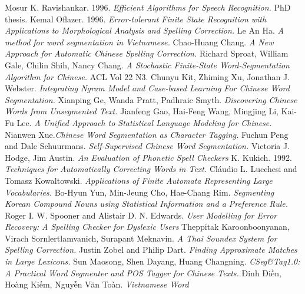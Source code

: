 \documentclass[a4paper,oneside]{book} %
\theoremstyle{break}
\begin{document}
\begin{thebibliography}{}
Mosur K. Ravishankar. 1996. {\em Efficient Algorithms for
  Speech Recognition.} PhD thesis. %
Kemal Oflazer. 1996. {\em Error-tolerant Finite State
  Recognition with Applications to Morphological Analysis and Spelling
  Correction.} %
Le An Ha. {\em A method for word segmentation in
  Vietnamese.} %
Chao-Huang Chang. {\em A New Approach for
  Automatic Chinese Spelling Correction.} %
Richard Sproat, William Gale, Chilin Shih, Nancy
  Chang. {\em A Stochastic Finite-State Word-Segmentation Algorithm for
  Chinese.} ACL Vol 22 N3.%
Chunyu Kit, Zhiming Xu, Jonathan
  J. Webster. {\em Integrating Ngram Model and Case-based Learning For
  Chinese Word Segmentation.}%
Xianping Ge, Wanda Pratt,
  Padhraic Smyth. {\em Discovering Chinese Words from Unsegmented
  Text.}%
Jianfeng Gao, Hai-Feng Wang, Mingjing Li, Kai-Fu
  Lee. {\em A Unified Approach to Statistical Language Modeling for
  Chinese.}%
\bibitem{}Nianwen Xue.{\em Chinese Word Segmentation as Character
  Tagging.}%
Fuchun Peng and Dale Schuurmans. {\em Self-Supervised Chinese
  Word Segmentation.}%
Victoria J. Hodge, Jim Austin. {\em An Evaluation of
  Phonetic Spell Checkers}%
K. Kukich. 1992. {\em Techniques for Automatically Correcting
  Words in Text.}
\bibitem{}Cláudio L. Lucchesi and Tomasz Kowaltowski. {\em Applications of
  Finite Automata Representing Large Vocabularies.}%
\bibitem{}Bo-Hyun Yun, Min-Jeung Cho, Hae-Chang Rim. {\em Segmenting Korean
  Compound Nouns using Statistical Information and a Preference
  Rule. }%
\bibitem{}Roger I. W. Spooner and Alistair D. N. Edwards. {\em User
  Modelling for Error Recovery: A Spelling Checker for Dyslexic
  Users}%
\bibitem{}Theppitak Karoonboonyanan, Virach Sornlertlamvanich,
  Surapant Meknavin. {\em A Thai Soundex System for Spelling Correction.}%
\bibitem{}Justin Zobel and Philip Dart. {\em Finding Approximate Matches in
  Large Lexicons.}%
\bibitem{}Sun Maosong, Shen Dayang, Huang Changning. {\em CSeg\&Tag1.0: A
  Practical Word Segmenter and POS Tagger for Chinese Texts.}%
Đinh Điền, Hoàng Kiếm, Nguyễn Văn Toàn. {\em Vietnamese Word
}
\end{thebibliography}
\end{document}
